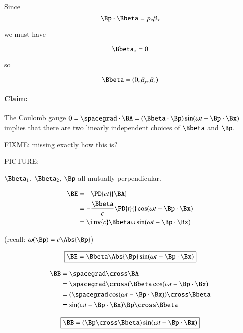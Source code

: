 Since
\begin{equation}\label{eqn:relativisticElectrodynamicsL16:190}
\Bp \cdot \Bbeta = p_x \beta_x
\end{equation}

we must have

\begin{equation}\label{eqn:relativisticElectrodynamicsL16:210}
\Bbeta_x = 0
\end{equation}

so

\begin{equation}\label{eqn:relativisticElectrodynamicsL16:230}
\Bbeta = (0, \beta_y, \beta_z)
\end{equation}

\paragraph{Claim:} The Coulomb gauge $0 = \spacegrad \cdot \BA = (\Bbeta \cdot \Bp)\sin(\omega t - \Bp \cdot \Bx)$ implies that there are two linearly independent choices of $\Bbeta$ and $\Bp$.

FIXME: missing exactly how this is?

PICTURE:

$\Bbeta_1$, $\Bbeta_2$, $\Bp$ all mutually perpendicular.

\begin{align*}
\BE
&= -\PD{ct}{\BA}  \\
&= -\frac{\Bbeta}{c} \PD{t}{} \cos(\omega t - \Bp \cdot \Bx) \\
&= \inv{c} \Bbeta \omega
\sin(\omega t - \Bp \cdot \Bx)
\end{align*}

(recall: $\omega(\Bp) = c\Abs{\Bp}$)

\begin{equation}\label{eqn:relativisticElectrodynamicsL16:250}
\boxed{
\BE = \Bbeta \Abs{\Bp} \sin(\omega t - \Bp \cdot \Bx)
}
\end{equation}

\begin{align*}
\BB
&= \spacegrad \cross \BA \\
&= \spacegrad \cross ( \Bbeta \cos(\omega t - \Bp \cdot \Bx) \\
&= (\spacegrad \cos(\omega t - \Bp \cdot \Bx)) \cross \Bbeta \\
&= \sin(\omega t - \Bp \cdot \Bx) \Bp \cross \Bbeta
\end{align*}

\begin{equation}\label{eqn:relativisticElectrodynamicsL16:270}
\boxed{
\BB = (\Bp \cross \Bbeta) \sin(\omega t - \Bp \cdot \Bx)
}
\end{equation}


